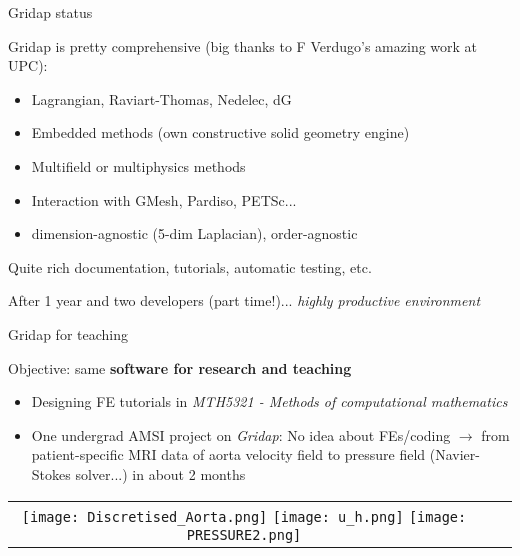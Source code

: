 %
%
%

\begin{frame}{Gridap status}

Gridap is pretty comprehensive (big thanks to F Verdugo's amazing work at UPC):

\begin{itemize}
\item Lagrangian, Raviart-Thomas, Nedelec, dG
\item Embedded methods (own constructive solid geometry engine)
\item Multifield or multiphysics methods
\item Interaction with GMesh, Pardiso, PETSc...
\item dimension-agnostic (5-dim Laplacian), order-agnostic
\end{itemize}

Quite rich documentation, tutorials, automatic testing, etc.

After 1 year and two developers (part time!)... \emph{highly productive environment}


\end{frame}

\begin{frame}{Gridap for teaching}

Objective: same \textbf{software for research and teaching}

\begin{overprint}
  \begin{itemize}
    \item Designing FE tutorials in \emph{MTH5321 - Methods of computational mathematics}
  \end{itemize}
\begin{itemize}
  \item One undergrad AMSI project on \emph{Gridap}:
  No idea about FEs/coding $\rightarrow$ from patient-specific MRI data of aorta velocity field to pressure field (Navier-Stokes solver...) in about 2 months
\end{itemize}

\begin{tabular}{ccc}
  \texttt{[image: Discretised\_Aorta.png]}
  \texttt{[image: u\_h.png]}
  \texttt{[image: PRESSURE2.png]}
\end{tabular}

\end{overprint}
\end{frame}

